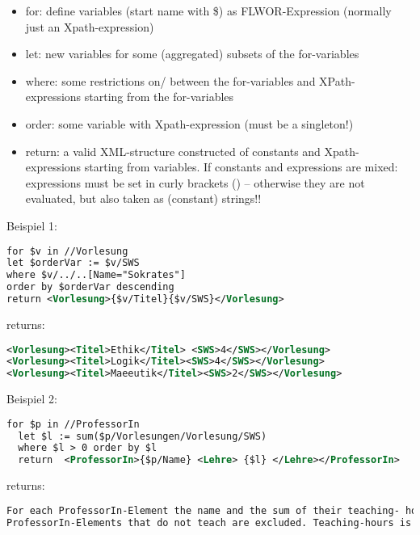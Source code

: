 \begin{itemize}
  \item for: define variables (start name with \$) as FLWOR-Expression
(normally just an Xpath-expression)
  \item let: new variables for some (aggregated) subsets of the for-variables
  \item where: some restrictions on/ between the for-variables and XPath- expressions starting from the for-variables
  \item order: some variable with Xpath-expression (must be a singleton!)
  \item return: a valid XML-structure constructed of constants and Xpath- expressions starting from variables. If constants and expressions are mixed: expressions must be set in curly brackets ({}) – otherwise they are not evaluated, but also taken as (constant) strings!!
\end{itemize}
Beispiel 1:
\begin{lstlisting}[language=XML]
for $v in //Vorlesung
let $orderVar := $v/SWS
where $v/../..[Name="Sokrates"]
order by $orderVar descending
return <Vorlesung>{$v/Titel}{$v/SWS}</Vorlesung>
\end{lstlisting}
returns:
\begin{lstlisting}[language=XML]
<Vorlesung><Titel>Ethik</Titel> <SWS>4</SWS></Vorlesung>
<Vorlesung><Titel>Logik</Titel><SWS>4</SWS></Vorlesung>
<Vorlesung><Titel>Maeeutik</Titel><SWS>2</SWS></Vorlesung>
\end{lstlisting}
Beispiel 2:
\begin{lstlisting}[language=XML]
  for $p in //ProfessorIn
  let $l := sum($p/Vorlesungen/Vorlesung/SWS)
  where $l > 0 order by $l
  return  <ProfessorIn>{$p/Name} <Lehre> {$l} </Lehre></ProfessorIn>
\end{lstlisting}
returns:
\begin{lstlisting}[language=XML]
For each ProfessorIn-Element the name and the sum of their teaching- hours (Semester-Wochen-Stunden).
ProfessorIn-Elements that do not teach are excluded. Teaching-hours is the order-criteria.
\end{lstlisting}

